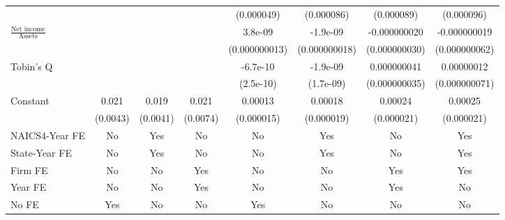 {\begin{tabular}{l*{7}{c}}
                    &                     &                     &                     &  (0.000049)         &  (0.000086)         &  (0.000089)         &  (0.000096)         \\
\addlinespace
$\frac{\textrm{Net income}}{\textrm{Assets}}$&                     &                     &                     &     3.8e-09         &    -1.9e-09         &-0.000000020         &-0.000000019         \\
                    &                     &                     &                     &(0.000000013)         &(0.000000018)         &(0.000000030)         &(0.000000062)         \\
\addlinespace
Tobin's Q           &                     &                     &                     &    -6.7e-10\sym{***}&    -1.9e-09         & 0.000000041         &  0.00000012\sym{*}  \\
                    &                     &                     &                     &   (2.5e-10)         &   (1.7e-09)         &(0.000000035)         &(0.000000071)         \\
\addlinespace
Constant            &       0.021\sym{***}&       0.019\sym{***}&       0.021\sym{***}&     0.00013\sym{***}&     0.00018\sym{***}&     0.00024\sym{***}&     0.00025\sym{***}\\
                    &    (0.0043)         &    (0.0041)         &    (0.0074)         &  (0.000015)         &  (0.000019)         &  (0.000021)         &  (0.000021)         \\
\addlinespace
NAICS4-Year FE      &          No         &         Yes         &          No         &          No         &         Yes         &          No         &         Yes         \\
\addlinespace
State-Year FE       &          No         &         Yes         &          No         &          No         &         Yes         &          No         &         Yes         \\
\addlinespace
Firm FE             &          No         &          No         &         Yes         &          No         &          No         &         Yes         &         Yes         \\
\addlinespace
Year FE             &          No         &          No         &         Yes         &          No         &          No         &         Yes         &          No         \\
\addlinespace
No FE               &         Yes         &          No         &          No         &         Yes         &          No         &          No         &          No         \\

\end{tabular}}
